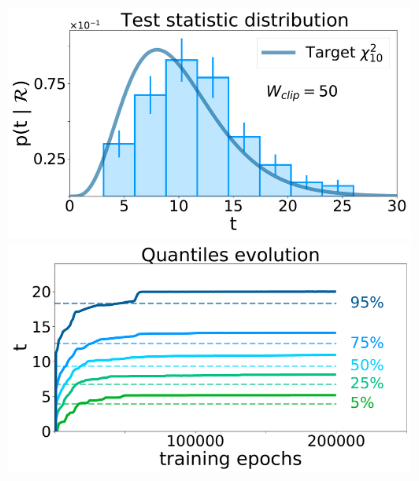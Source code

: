 \documentclass{beamer}
\begin{document}
\begin{frame}
{\begin{columns}[onlytextwidth]
\begin{column}{0.33\textwidth}
						\begin{figure}
							\centering 
							\includegraphics[width=1.0\textwidth]{../PLOTS/DRIFT_TIME/thesis/a_distribution_50_0.pdf}
							\includegraphics[width=1.0\textwidth]{../PLOTS/DRIFT_TIME/thesis/a_quantiles_50_0.pdf}
						\end{figure}

				\end{column}


				\begin{column}{0.33\textwidth}


\end{column}
\end{columns}}
\end{frame}
\end{document}
